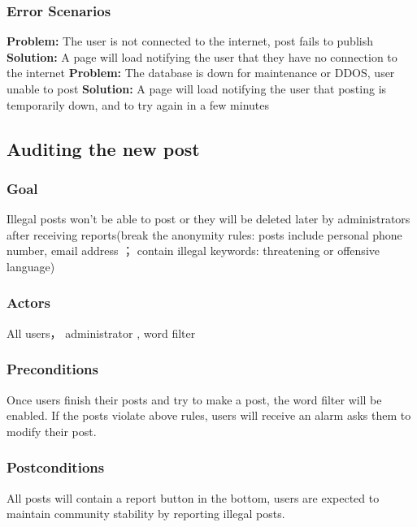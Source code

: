 \documentclass[12pt]{article}
\begin{document}
\subsubsection{Error Scenarios}
\textbf{Problem:}
 The user is not connected to the internet, post fails to publish
\textbf{Solution:}
  A page will load notifying the user that they have no connection to the internet
\textbf{Problem:}
  The database is down for maintenance or DDOS, user unable to post
\textbf{Solution:}
  A page will load notifying the user that posting is temporarily down, and to try again in a few minutes

\subsection{Auditing the new post}

  \subsubsection{Goal}
  Illegal posts won’t be able to post or they will be deleted later by administrators after receiving reports(break the anonymity rules: posts include personal phone number, email address ； contain illegal keywords: threatening or offensive language)


  \subsubsection{Actors}
  All users， administrator , word filter


  \subsubsection{Preconditions}
  Once users finish their posts and try to make a post, the word filter will be enabled. If the posts violate above rules, users will receive an alarm asks them to modify their post.


  \subsubsection{Postconditions}
   All posts will contain a report button in the bottom,  users are expected to maintain community stability by reporting illegal posts.
\end{document}
